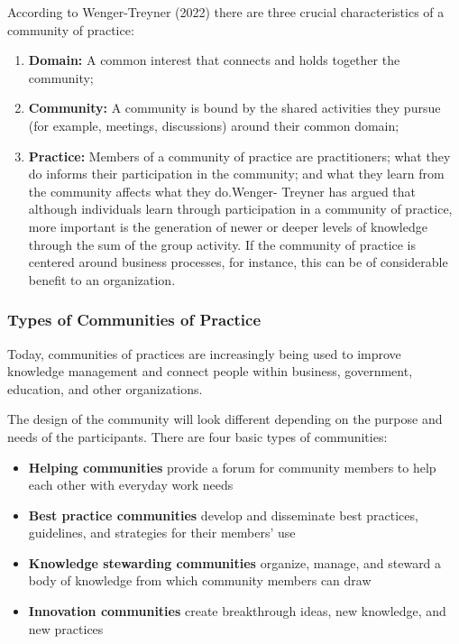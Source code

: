 \documentclass[
  letterpaper,
  DIV=11,
  numbers=noendperiod]{scrreprt}
\providecommand{\tightlist}{%
  \setlength{\itemsep}{0pt}\setlength{\parskip}{0pt}}\usepackage{longtable,booktabs,array}
\begin{document}
According to Wenger-Treyner (2022) there are three crucial
characteristics of a community of practice:

\begin{enumerate}
\def\labelenumi{\arabic{enumi}.}
\tightlist
\item
  \textbf{Domain:} A common interest that connects and holds together
  the community;
\item
  \textbf{Community:} A community is bound by the shared activities they
  pursue (for example, meetings, discussions) around their common
  domain;
\item
  \textbf{Practice:} Members of a community of practice are
  practitioners; what they do informs their participation in the
  community; and what they learn from the community affects what they
  do.Wenger- Treyner has argued that although individuals learn through
  participation in a community of practice, more important is the
  generation of newer or deeper levels of knowledge through the sum of
  the group activity. If the community of practice is centered around
  business processes, for instance, this can be of considerable benefit
  to an organization.
\end{enumerate}

\subsubsection*{Types of Communities of
Practice}\label{types-of-communities-of-practice}

Today, communities of practices are increasingly being used to improve
knowledge management and connect people within business, government,
education, and other organizations.

The design of the community will look different depending on the purpose
and needs of the participants. There are four basic types of
communities:

\begin{itemize}
\tightlist
\item
  \textbf{Helping communities} provide a forum for community members to
  help each other with everyday work needs
\item
  \textbf{Best practice communities} develop and disseminate best
  practices, guidelines, and strategies for their members' use
\item
  \textbf{Knowledge stewarding communities} organize, manage, and
  steward a body of knowledge from which community members can draw
\item
  \textbf{Innovation communities} create breakthrough ideas, new
  knowledge, and new practices
\end{itemize}
\end{document}
